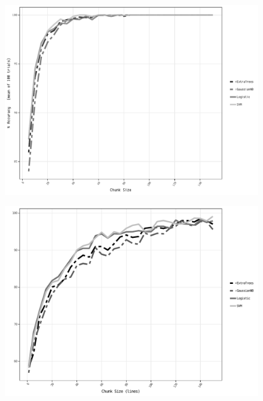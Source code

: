 \documentclass[11pt,a4paper]{scrartcl} %
\begin{document}
\begin{figure}
\centering
\begin{minipage}{.5\textwidth}
    \label{fig:clf_chunksz_silov_bw}
    \includegraphics[width=\textwidth]{clf_chunk_silov_bw.pdf}
\end{minipage}%
\begin{minipage}{.5\textwidth}
    \label{fig:clf_chunksz_bw}
    \includegraphics[width=\textwidth]{clf_chunksz_bw.pdf}
\end{minipage}
\end{figure}
\end{document}
